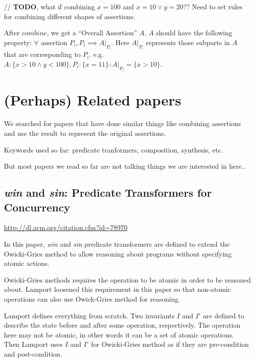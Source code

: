 \documentclass[12pt, fleqn]{article}
\begin{document}
// \textbf{TODO}, what if combining $x = 100$ and $x = 10 \lor y =
20$??  Need to set rules for combining different shapes of assertions.

\bigskip

After $combine$, we get a ``Overall Assertion'' $A$. $A$ should have
the following property: $\forall$ assertion $P_i, P_i \implies
A|_{P_i}$.  Here $A|_{P_i}$ represents those subparts in $A$ that are
corresponding to $P_i$. e.g. $A: \{x > 10 \land y < 100\}, P_i: \{x =
11\} \therefore A|_{P_i} = \{x > 10\}$.


\section{(Perhaps) Related papers}

We searched for papers that have done similar things like combining
assertions and use the result to represent the original assertions.

Keywords used so far: predicate tranformers, composition, synthesis,
etc.

But most papers we read so far are not talking things we are
interested in here..

\subsection{\textsl{win} and \textsl{sin}: Predicate Transformers for Concurrency}

\url{http://dl.acm.org/citation.cfm?id=78970}

\bigskip

In this paper, \textsl{win} and \textsl{sin} predicate transformers
are defined to extend the Owicki-Gries method to allow reasoning about
programs without specifying atomic actions.

Owicki-Gries methods requires the operation to be atomic in order to
be reasoned about. Lamport loosened this requirement in this paper so
that non-atomic operations can also use Owick-Gries method for
reasoning.

Lamport defines everything from scratch. Two invariants $I$ and $I'$
are defined to describe the state before and after some operation,
respectively. The operation here may not be atomic, in other words it
can be a set of atomic operations. Then Lamport uses $I$ and $I'$ for
Owicki-Gries method as if they are pre-condition and post-condition.
\end{document}
